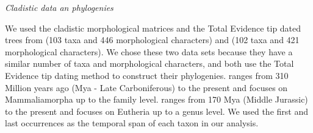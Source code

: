 \documentclass[12pt,letterpaper]{article}
\renewcommand{\subsection}[1]{%
\bigskip
\begin{center}
\begin{large}
\normalfont\itshape #1
\end{large}
\end{center}}
\begin{document}

\subsection{Cladistic data an phylogenies}
We used the cladistic morphological matrices and the Total Evidence tip dated trees \cite{ronquista2012} from \cite{Slater2012MEE} (103 taxa and 446 morphological characters) and \cite{beckancient2014} (102 taxa and 421 morphological characters). We chose these two data sets because they have a similar number of taxa and morphological characters, and both use the Total Evidence tip dating method \cite{ronquista2012} to construct their phylogenies. \cite{Slater2012MEE} ranges from 310 Million years ago (Mya - Late Carboniferous) to the present and focuses on Mammaliamorpha up to the family level. \cite{beckancient2014} ranges from 170 Mya (Middle Jurassic) to the present and focuses on Eutheria up to a genus level. We used the first and last occurrences as the temporal span of each taxon in our analysis.
\end{document}
